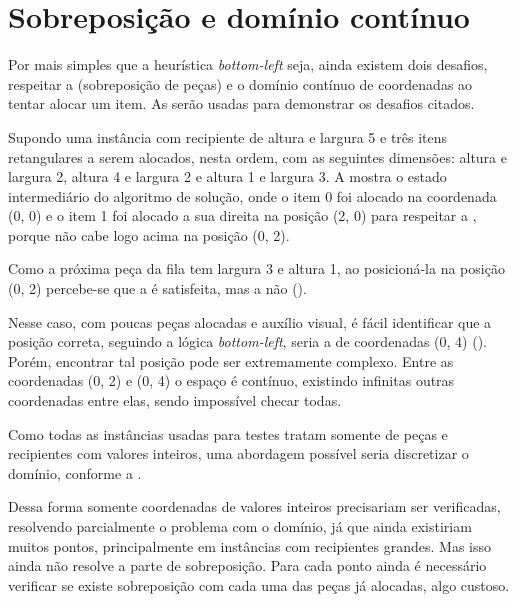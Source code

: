 \section{Sobreposição e domínio contínuo}\label{sec:sobreposicao-e-dominio-infinito}

Por mais simples que a heurística \textit{bottom-left} seja, ainda existem dois desafios,
respeitar a  (sobreposição de peças) e o domínio contínuo de coordenadas
ao tentar alocar um item.
As  serão usadas para
demonstrar os desafios citados.

Supondo uma instância com recipiente de altura e largura 5 e três itens retangulares a serem
alocados, nesta ordem, com as seguintes dimensões: altura e largura 2, altura 4 e largura 2 e
altura 1 e largura 3.
A  mostra o estado intermediário do algoritmo de solução, onde o
item 0 foi alocado na coordenada (0, 0) e o item 1 foi alocado a sua direita na posição (2, 0)
para respeitar a , porque não cabe logo acima na posição (0, 2).




Como a próxima peça da fila tem largura 3 e altura 1, ao posicioná-la na posição (0, 2)
percebe-se que a  é satisfeita, mas a  não ().



Nesse caso, com poucas peças alocadas e auxílio visual, é fácil identificar que a posição correta,
seguindo a lógica \textit{bottom-left}, seria a de coordenadas (0, 4)
().
Porém, encontrar tal posição pode ser extremamente complexo.
Entre as coordenadas (0, 2) e (0, 4) o espaço é contínuo, existindo infinitas outras coordenadas
entre elas, sendo impossível checar todas.



Como todas as instâncias usadas para testes tratam somente de peças e recipientes com valores
inteiros, uma abordagem possível seria discretizar o domínio, conforme a
.



Dessa forma somente coordenadas de valores inteiros precisariam ser verificadas, resolvendo
parcialmente o problema com o domínio, já que ainda existiriam muitos pontos, principalmente em
instâncias com recipientes grandes.
Mas isso ainda não resolve a parte de sobreposição.
Para cada ponto ainda é necessário verificar se existe sobreposição com cada uma das peças já
alocadas, algo custoso.


